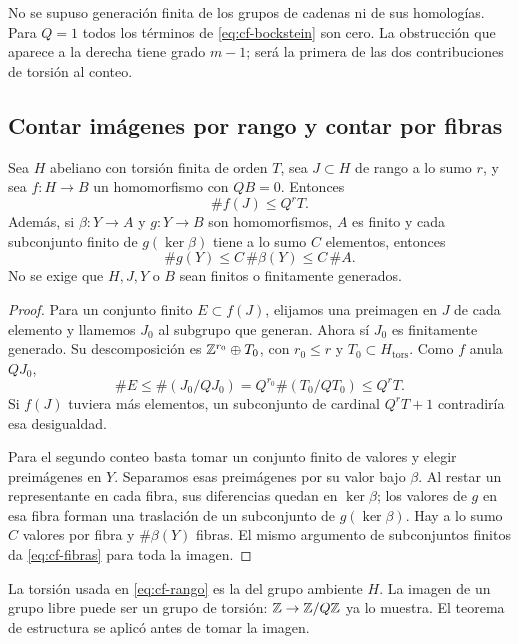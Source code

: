 No se supuso generación finita de los grupos de cadenas ni de
sus homologías. Para $Q=1$ todos los términos de
\eqref{eq:cf-bockstein} son cero. La obstrucción que aparece a la
derecha tiene grado $m-1$; será la primera de las dos contribuciones
de torsión al conteo.

\subsection{Contar imágenes por rango y contar por fibras}

\begin{proposicion}
\label{prop:cf-rango-fibras}
Sea $H$ abeliano con torsión finita de orden $T$, sea $J\subset H$
de rango a lo sumo $r$, y sea $f:H\to B$ un homomorfismo con
$QB=0$. Entonces
\begin{equation}
 \#f(J)\le Q^rT.
 \label{eq:cf-rango}
\end{equation}
Además, si $\beta:Y\to A$ y $g:Y\to B$ son homomorfismos,
$A$ es finito y cada subconjunto finito de $g(\ker\beta)$ tiene
a lo sumo $C$ elementos, entonces
\begin{equation}
 \#g(Y)\le C\,\#\beta(Y)\le C\,\#A.
 \label{eq:cf-fibras}
\end{equation}
No se exige que $H,J,Y$ o $B$ sean finitos o finitamente generados.
\end{proposicion}

\begin{proof}
Para un conjunto finito $E\subset f(J)$, elijamos una preimagen
en $J$ de cada elemento y llamemos $J_0$ al subgrupo que generan.
Ahora sí $J_0$ es finitamente generado. Su descomposición es
$\mathbb{Z}^{r_0}\oplus T_0$, con $r_0\le r$ y
$T_0\subset H_{\mathrm{tors}}$. Como $f$ anula $QJ_0$,
\[
 \#E\le\#(J_0/QJ_0)
 =Q^{r_0}\#(T_0/QT_0)\le Q^rT.
\]
Si $f(J)$ tuviera más elementos, un subconjunto de cardinal
$Q^rT+1$ contradiría esa desigualdad.

Para el segundo conteo basta tomar un conjunto finito de valores
y elegir preimágenes en $Y$. Separamos esas preimágenes por
su valor bajo $\beta$. Al restar un representante en cada fibra,
sus diferencias quedan en $\ker\beta$; los valores de $g$ en
esa fibra forman una traslación de un subconjunto de
$g(\ker\beta)$. Hay a lo sumo $C$ valores por fibra y
$\#\beta(Y)$ fibras. El mismo argumento de subconjuntos finitos
da \eqref{eq:cf-fibras} para toda la imagen.
\end{proof}

La torsión usada en \eqref{eq:cf-rango} es la del grupo ambiente
$H$. La imagen de un grupo libre puede ser un grupo de torsión:
$\mathbb{Z}\to\mathbb{Z}/Q\mathbb{Z}$ ya lo muestra. El teorema de estructura se
aplicó antes de tomar la imagen.

